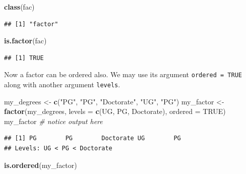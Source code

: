 \documentclass[
]{book}
\newenvironment{Shaded}{\begin{snugshade}}{\end{snugshade}}
\newcommand{\AttributeTok}[1]{\textcolor[rgb]{0.13,0.29,0.53}{#1}}
\newcommand{\CommentTok}[1]{\textcolor[rgb]{0.56,0.35,0.01}{\textit{#1}}}
\newcommand{\ConstantTok}[1]{\textcolor[rgb]{0.56,0.35,0.01}{#1}}
\newcommand{\FunctionTok}[1]{\textcolor[rgb]{0.13,0.29,0.53}{\textbf{#1}}}
\newcommand{\NormalTok}[1]{#1}
\newcommand{\OtherTok}[1]{\textcolor[rgb]{0.56,0.35,0.01}{#1}}
\newcommand{\StringTok}[1]{\textcolor[rgb]{0.31,0.60,0.02}{#1}}
\begin{document}
\begin{Shaded}
\begin{Highlighting}[]
\FunctionTok{class}\NormalTok{(fac)}
\end{Highlighting}
\end{Shaded}

\begin{verbatim}
## [1] "factor"
\end{verbatim}

\begin{Shaded}
\begin{Highlighting}[]
\FunctionTok{is.factor}\NormalTok{(fac)}
\end{Highlighting}
\end{Shaded}

\begin{verbatim}
## [1] TRUE
\end{verbatim}

Now a factor can be ordered also. We may use its argument \texttt{ordered\ =\ TRUE} along with another argument \texttt{levels}.

\begin{Shaded}
\begin{Highlighting}[]
\NormalTok{my\_degrees }\OtherTok{\textless{}{-}} \FunctionTok{c}\NormalTok{(}\StringTok{"PG"}\NormalTok{, }\StringTok{"PG"}\NormalTok{, }\StringTok{"Doctorate"}\NormalTok{, }\StringTok{"UG"}\NormalTok{, }\StringTok{"PG"}\NormalTok{)}
\NormalTok{my\_factor }\OtherTok{\textless{}{-}} \FunctionTok{factor}\NormalTok{(my\_degrees, }\AttributeTok{levels =} \FunctionTok{c}\NormalTok{(}\StringTok{\textquotesingle{}UG\textquotesingle{}}\NormalTok{, }\StringTok{\textquotesingle{}PG\textquotesingle{}}\NormalTok{, }\StringTok{\textquotesingle{}Doctorate\textquotesingle{}}\NormalTok{), }\AttributeTok{ordered =} \ConstantTok{TRUE}\NormalTok{)}
\NormalTok{my\_factor }\CommentTok{\# notice output here}
\end{Highlighting}
\end{Shaded}

\begin{verbatim}
## [1] PG        PG        Doctorate UG        PG       
## Levels: UG < PG < Doctorate
\end{verbatim}

\begin{Shaded}
\begin{Highlighting}[]
\FunctionTok{is.ordered}\NormalTok{(my\_factor)}
\end{Highlighting}
\end{Shaded}
\end{document}
